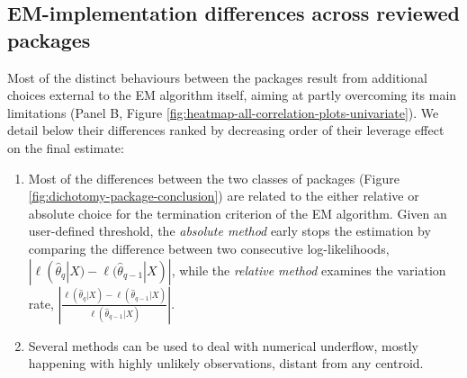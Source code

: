 \hypertarget{em-implementation-differences-across-reviewed-packages}{%
\subsection{EM-implementation differences across reviewed packages}\label{em-implementation-differences-across-reviewed-packages}}

\label{sec:em-differences}

Most of the distinct behaviours between the packages result from additional choices external to the EM algorithm itself, aiming at partly overcoming its main limitations (Panel B, Figure \ref{fig:heatmap-all-correlation-plots-univariate}). We detail below their differences ranked by decreasing order of their leverage effect on the final estimate:

\begin{enumerate}
\def\labelenumi{\arabic{enumi}.}
\tightlist
\item
  Most of the differences between the two classes of packages (Figure \ref{fig:dichotomy-package-conclusion}) are
  related to the either relative or absolute choice for the termination criterion of the EM algorithm. Given an user-defined threshold, the \emph{absolute method} early stops the estimation by comparing the difference between two consecutive log-likelihoods, \(|\ell(\hat{\theta}_{q}|X) - \ell(\hat{\theta}_{q-1}|X)|\), while the \emph{relative method} examines the variation rate, \(\left\lvert\frac{\ell(\hat{\theta}_{q}|X) - \ell(\hat{\theta}_{q-1}|X)}{\ell(\hat{\theta}_{q-1}|X)}\right\lvert\).
\item
  Several methods can be used to deal with numerical underflow, mostly happening with highly unlikely observations, distant from any centroid.


\end{enumerate}
